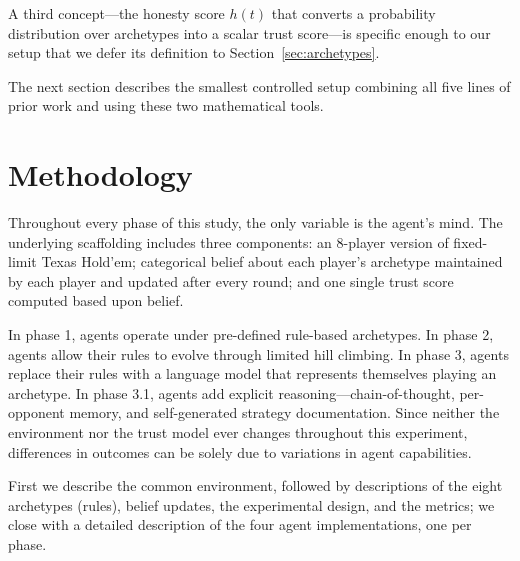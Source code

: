 \documentclass[10pt]{article} %
\begin{document}
A third concept---the honesty score $h(t)$ that converts a
probability distribution over archetypes into a scalar trust
score---is specific enough to our setup that we defer its
definition to Section~\ref{sec:archetypes}.

The next section describes the smallest controlled setup combining
all five lines of prior work and using these two mathematical tools.

\section{Methodology}

Throughout every phase of this study, the only variable is the
agent's mind. The underlying scaffolding includes three components:
an 8-player version of fixed-limit Texas Hold'em; categorical belief
about each player's archetype maintained by each player and updated
after every round; and one single trust score computed based upon
belief.

In phase 1, agents operate under pre-defined rule-based archetypes.
In phase 2, agents allow their rules to evolve through limited hill
climbing. In phase 3, agents replace their rules with a language
model that represents themselves playing an archetype. In phase 3.1,
agents add explicit reasoning---chain-of-thought, per-opponent
memory, and self-generated strategy documentation. Since neither the
environment nor the trust model ever changes throughout this
experiment, differences in outcomes can be solely due to variations
in agent capabilities.

First we describe the common environment, followed by descriptions
of the eight archetypes (rules), belief updates, the experimental
design, and the metrics; we close with a detailed description of the
four agent implementations, one per phase.
\end{document}
